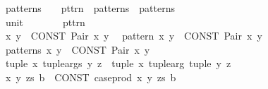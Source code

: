 \begin{isabellebody}
\ \ {\isachardoublequoteopen}{\isacharunderscore}{\kern0pt}patterns{\isachardoublequoteclose}\ \ \ {\isacharcolon}{\kern0pt}{\isacharcolon}{\kern0pt}\ {\isachardoublequoteopen}pttrn\ {\isasymRightarrow}\ patterns\ {\isasymRightarrow}\ patterns{\isachardoublequoteclose}\ \ \ \ \ \ {\isacharparenleft}{\kern0pt}{\isachardoublequoteopen}{\isacharunderscore}{\kern0pt}{\isacharcomma}{\kern0pt}{\isacharslash}{\kern0pt}\ {\isacharunderscore}{\kern0pt}{\isachardoublequoteclose}{\isacharparenright}{\kern0pt}\isanewline
\ \ {\isachardoublequoteopen}{\isacharunderscore}{\kern0pt}unit{\isachardoublequoteclose}\ \ \ \ \ \ \ {\isacharcolon}{\kern0pt}{\isacharcolon}{\kern0pt}\ pttrn\ \ \ \ \ \ \ \ \ \ \ \ \ \ \ \ \ \ \ \ \ \ \ \ \ \ \ \ \ \ \ \ {\isacharparenleft}{\kern0pt}{\isachardoublequoteopen}{\isacharprime}{\kern0pt}{\isacharparenleft}{\kern0pt}{\isacharprime}{\kern0pt}{\isacharparenright}{\kern0pt}{\isachardoublequoteclose}{\isacharparenright}{\kern0pt}\isanewline
{}\isamarkupfalse%
\isanewline
\ \ {\isachardoublequoteopen}{\isacharparenleft}{\kern0pt}x{\isacharcomma}{\kern0pt}\ y{\isacharparenright}{\kern0pt}{\isachardoublequoteclose}\ {\isasymrightleftharpoons}\ {\isachardoublequoteopen}CONST\ Pair\ x\ y{\isachardoublequoteclose}\isanewline
\ \ {\isachardoublequoteopen}{\isacharunderscore}{\kern0pt}pattern\ x\ y{\isachardoublequoteclose}\ {\isasymrightleftharpoons}\ {\isachardoublequoteopen}CONST\ Pair\ x\ y{\isachardoublequoteclose}\isanewline
\ \ {\isachardoublequoteopen}{\isacharunderscore}{\kern0pt}patterns\ x\ y{\isachardoublequoteclose}\ {\isasymrightleftharpoons}\ {\isachardoublequoteopen}CONST\ Pair\ x\ y{\isachardoublequoteclose}\isanewline
\ \ {\isachardoublequoteopen}{\isacharunderscore}{\kern0pt}tuple\ x\ {\isacharparenleft}{\kern0pt}{\isacharunderscore}{\kern0pt}tuple{\isacharunderscore}{\kern0pt}args\ y\ z{\isacharparenright}{\kern0pt}{\isachardoublequoteclose}\ {\isasymrightleftharpoons}\ {\isachardoublequoteopen}{\isacharunderscore}{\kern0pt}tuple\ x\ {\isacharparenleft}{\kern0pt}{\isacharunderscore}{\kern0pt}tuple{\isacharunderscore}{\kern0pt}arg\ {\isacharparenleft}{\kern0pt}{\isacharunderscore}{\kern0pt}tuple\ y\ z{\isacharparenright}{\kern0pt}{\isacharparenright}{\kern0pt}{\isachardoublequoteclose}\isanewline
\ \ {\isachardoublequoteopen}{\isasymlambda}{\isacharparenleft}{\kern0pt}x{\isacharcomma}{\kern0pt}\ y{\isacharcomma}{\kern0pt}\ zs{\isacharparenright}{\kern0pt}{\isachardot}{\kern0pt}\ b{\isachardoublequoteclose}\ {\isasymrightleftharpoons}\ {\isachardoublequoteopen}CONST\ case{\isacharunderscore}{\kern0pt}prod\ {\isacharparenleft}{\kern0pt}{\isasymlambda}x\ {\isacharparenleft}{\kern0pt}y{\isacharcomma}{\kern0pt}\ zs{\isacharparenright}{\kern0pt}{\isachardot}{\kern0pt}\ b{\isacharparenright}{\kern0pt}{\isachardoublequoteclose}\isanewline

\end{isabellebody}
